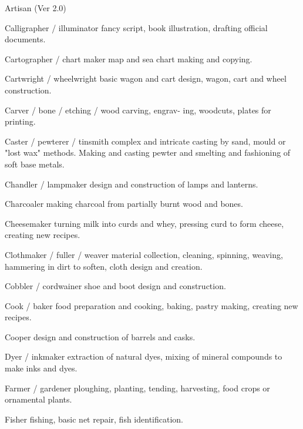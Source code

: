 \begin{Chapter}{Artisan (Ver 2.0)}
\begin{Description}
\item[Calligrapher / illuminator] fancy script, book illustration,
  drafting official documents.

\item[Cartographer / chart] maker map and sea chart making and
  copying.

\item[Cartwright / wheelwright] basic wagon and cart design, wagon,
  cart and wheel construction.

\item[Carver / bone / etching / wood] carving, engrav- ing, woodcuts,
  plates for printing.

\item[Caster / pewterer / tinsmith] complex and intricate casting by
  sand, mould or "lost wax" methods.  Making and casting pewter and
  smelting and fashioning of soft base metals.

\item[Chandler / lampmaker] design and construction of 
lamps and lanterns. 

\item[Charcoaler] making charcoal from partially burnt wood and bones.

\item[Cheesemaker] turning milk into curds and whey, pressing curd to
  form cheese, creating new recipes.

\item[Clothmaker / fuller / weaver] material collection, cleaning,
  spinning, weaving, hammering in dirt to soften, cloth design and
  creation.

\item[Cobbler / cordwainer] shoe and boot design and construction.

\item[Cook / baker] food preparation and cooking, baking, pastry
  making, creating new recipes.

\item[Cooper] design and construction of barrels and casks.

\item[Dyer / inkmaker] extraction of natural dyes, mixing of mineral
  compounds to make inks and dyes.

\item[Farmer / gardener] ploughing, planting, tending, harvesting,
  food crops or ornamental plants.

\item[Fisher] fishing, basic net repair, fish identification. 


\end{Description}
\end{Chapter}
